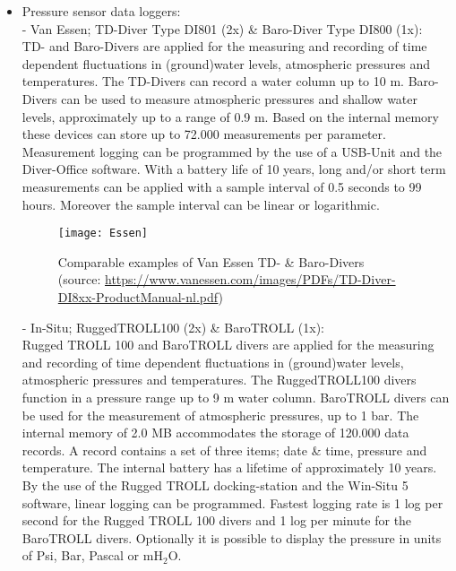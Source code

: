 \begin{itemize}
\item Pressure sensor data loggers: \\
\-- Van Essen; TD-Diver Type DI801 (2x) \& Baro-Diver Type DI800 (1x):\\
TD- and Baro-Divers are applied for the measuring and recording of time dependent fluctuations in (ground)water levels, atmospheric pressures and temperatures. The TD-Divers can record a water column up to 10 m. Baro-Divers can be used to measure atmospheric pressures and shallow water levels, approximately up to a range of 0.9 m. Based on the internal memory these devices can store up to 72.000 measurements per parameter. Measurement logging can be programmed by the use of a USB-Unit and the Diver-Office software. With a battery life of 10 years, long and/or short term measurements can be applied with a sample interval of 0.5 seconds to 99 hours. Moreover the sample interval can be linear or logarithmic.

\begin{figure}[h!]
 \centering\texttt{[image: Essen]}
 \captionsetup{justification=centering}
 \caption[Comparable examples of Van Essen TD- \& Baro-Divers]{Comparable examples of Van Essen TD- \& Baro-Divers \\(source: \url{https://www.vanessen.com/images/PDFs/TD-Diver-DI8xx-ProductManual-nl.pdf})}
 \label{fig:Essen}
\end{figure}

\-- In-Situ; RuggedTROLL100 (2x) \& BaroTROLL (1x):\\
Rugged TROLL 100 and BaroTROLL divers are applied for the measuring and recording of time dependent fluctuations in (ground)water levels, atmospheric pressures and temperatures. The RuggedTROLL100 divers function in a pressure range up to 9 m water column. BaroTROLL divers can be used for the measurement of atmospheric pressures, up to 1 bar. The internal memory of 2.0 MB accommodates the storage of 120.000 data records. A record contains a set of three items; date \& time, pressure and temperature. The internal battery has a lifetime of approximately 10 years. By the use of the Rugged TROLL docking-station and the Win-Situ 5 software, linear logging can be programmed. Fastest logging rate is 1 log per second for the Rugged TROLL 100 divers and 1 log per minute for the BaroTROLL divers. Optionally it is possible to display the pressure in units of Psi, Bar, Pascal or mH$_{2}$O. 



\end{itemize}
